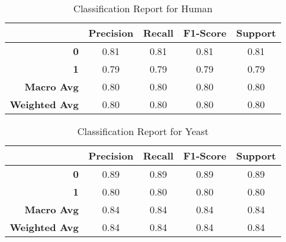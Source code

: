 \documentclass{article}
\begin{document}
\begin{table}[htbp]

\centering
\renewcommand{\arraystretch}{1.2}

\begin{tabular}{rcccc}
  \toprule
  & \textbf{Precision} & \textbf{Recall} & \textbf{F1-Score} & \textbf{Support} \\
  \midrule
  \textbf{0} & 0.81 & 0.81 & 0.81 & 0.81 \\
  \textbf{1} & 0.79 & 0.79 & 0.79 & 0.79 \\
  \textbf{Macro Avg} & 0.80 & 0.80 & 0.80 & 0.80 \\
  \textbf{Weighted Avg} & 0.80 & 0.80 & 0.80 & 0.80 \\
  \bottomrule
\end{tabular}

\caption{Classification Report for Human}
\end{table}


\begin{table}[htbp]

\centering
\renewcommand{\arraystretch}{1.2}

\begin{tabular}{rcccc}
  \toprule
  & \textbf{Precision} & \textbf{Recall} & \textbf{F1-Score} & \textbf{Support} \\
  \midrule
  \textbf{0} & 0.89 & 0.89 & 0.89 & 0.89 \\
  \textbf{1} & 0.80 & 0.80 & 0.80 & 0.80 \\
  \textbf{Macro Avg} & 0.84 & 0.84 & 0.84 & 0.84 \\
  \textbf{Weighted Avg} & 0.84 & 0.84 & 0.84 & 0.84 \\
  \bottomrule
\end{tabular}

\caption{Classification Report for Yeast}
\end{table}
\end{document}
